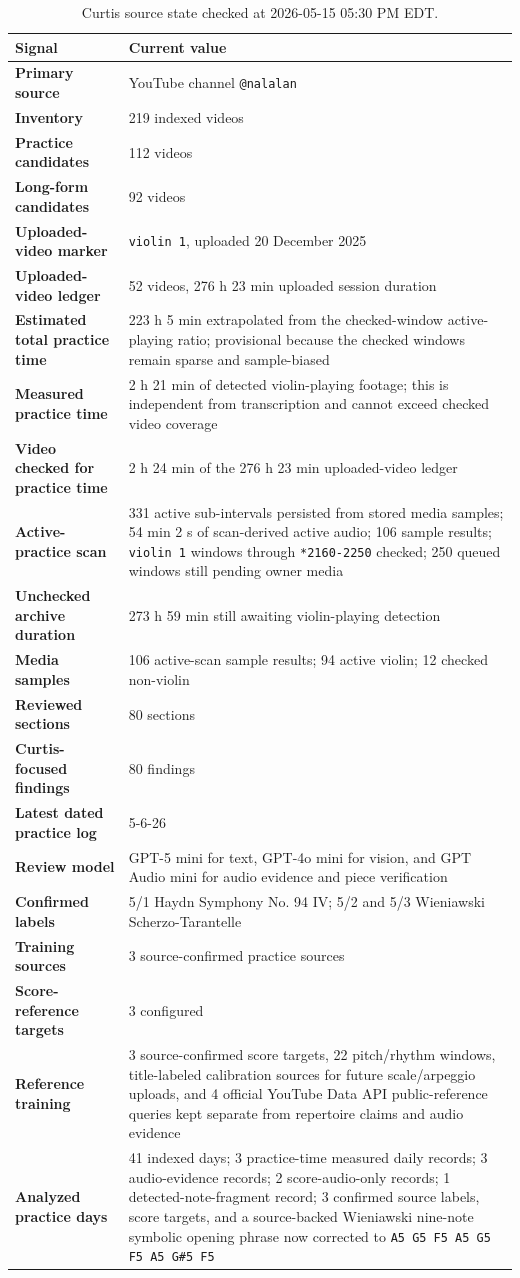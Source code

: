 \documentclass[12pt,letterpaper]{article}
\renewcommand{\arraystretch}{1.14}
\newcommand{\metric}[2]{\textbf{#1} & #2\\}
\begin{document}
\begin{table}[htbp]
\centering
\scriptsize
\setlength{\tabcolsep}{4pt}
\renewcommand{\arraystretch}{0.94}
\caption{Curtis source state checked at 2026-05-15 05:30 PM EDT.}
\label{tab:state}
\begin{tabularx}{\textwidth}{>{\bfseries}p{}X}
\toprule
Signal & Current value \\
\midrule
\metric{Primary source}{YouTube channel \texttt{@nalalan}}
\metric{Inventory}{219 indexed videos}
\metric{Practice candidates}{112 videos}
\metric{Long-form candidates}{92 videos}
\metric{Uploaded-video marker}{\texttt{violin 1}, uploaded 20 December 2025}
\metric{Uploaded-video ledger}{52 videos, 276 h 23 min uploaded session duration}
\metric{Estimated total practice time}{223 h 5 min extrapolated from the checked-window active-playing ratio; provisional because the checked windows remain sparse and sample-biased}
\metric{Measured practice time}{2 h 21 min of detected violin-playing footage; this is independent from transcription and cannot exceed checked video coverage}
\metric{Video checked for practice time}{2 h 24 min of the 276 h 23 min uploaded-video ledger}
\metric{Active-practice scan}{331 active sub-intervals persisted from stored media samples; 54 min 2 s of scan-derived active audio; 106 sample results; \texttt{violin 1} windows through \texttt{*2160-2250} checked; 250 queued windows still pending owner media}
\metric{Unchecked archive duration}{273 h 59 min still awaiting violin-playing detection}
\metric{Media samples}{106 active-scan sample results; 94 active violin; 12 checked non-violin}
\metric{Reviewed sections}{80 sections}
\metric{Curtis-focused findings}{80 findings}
\metric{Latest dated practice log}{5-6-26}
\metric{Review model}{GPT-5 mini for text, GPT-4o mini for vision, and GPT Audio mini for audio evidence and piece verification}
\metric{Confirmed labels}{5/1 Haydn Symphony No. 94 IV; 5/2 and 5/3 Wieniawski Scherzo-Tarantelle}
\metric{Training sources}{3 source-confirmed practice sources}
\metric{Score-reference targets}{3 configured}
\metric{Reference training}{3 source-confirmed score targets, 22 pitch/rhythm windows, title-labeled calibration sources for future scale/arpeggio uploads, and 4 official YouTube Data API public-reference queries kept separate from repertoire claims and audio evidence}
\metric{Analyzed practice days}{41 indexed days; 3 practice-time measured daily records; 3 audio-evidence records; 2 score-audio-only records; 1 detected-note-fragment record; 3 confirmed source labels, score targets, and a source-backed Wieniawski nine-note symbolic opening phrase now corrected to \texttt{A5 G5 F5 A5 G5 F5 A5 G\#5 F5}}

\end{tabularx}
\end{table}
\end{document}
